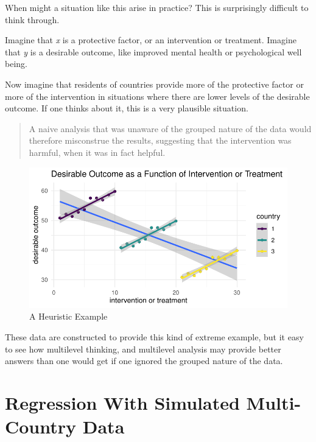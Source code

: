 \documentclass[
  letterpaper,
  DIV=11,
  numbers=noendperiod]{scrreprt}
\begin{document}
When might a situation like this arise in practice? This is surprisingly
difficult to think through.

Imagine that \emph{x} is a protective factor, or an intervention or
treatment. Imagine that \emph{y} is a desirable outcome, like improved
mental health or psychological well being.

Now imagine that residents of countries provide more of the protective
factor or more of the intervention in situations where there are lower
levels of the desirable outcome. If one thinks about it, this is a very
plausible situation.

\begin{quote}
A naive analysis that was unaware of the grouped nature of the data
would therefore misconstrue the results, suggesting that the
intervention was harmful, when it was in fact helpful.
\end{quote}

\begin{figure}

{\centering \includegraphics{./cross-sectional_files/figure-pdf/unnamed-chunk-9-1.pdf}

}

\caption{A Heuristic Example}

\end{figure}

These data are constructed to provide this kind of extreme example, but
it easy to see how multilevel thinking, and multilevel analysis may
provide better answers than one would get if one ignored the grouped
nature of the data.

\hypertarget{sec-regression}{%
\section{Regression With Simulated Multi-Country
Data}\label{sec-regression}}
\end{document}
